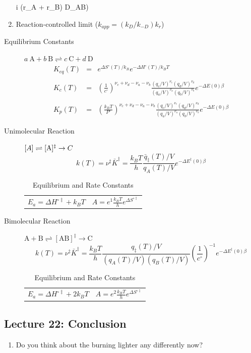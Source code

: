 \documentclass[11pt]{article}
\begin{document}
\begin{enumerate}
i (r_A + r_B) D_{AB}\))
\item Reaction-controlled limit (\(k_{app}=(k_D/k_{-D})k_r\))
\end{enumerate}

\begin{table}
\begin{center}
    \caption{\large{Equilibrium and Rate Constants}}
   \begin{description}
   \item[Equilibrium Constants] $a~\text{A} + b~\text{B} \rightleftharpoons c~\text{C} + d~\text{D} $
     \begin{eqnarray*}
       K_{eq}(T) &=& e^{\Delta S^\circ(T)/k_B}e^{-\Delta H^\circ(T)/k_BT}
       \\ \\
            K_c(T) &=&
          \left(\frac{1}{c^\circ}\right)^{\nu_c+\nu_d-\nu_a-\nu_b}\frac{(q_c/V)^{\nu_c}(q_d/V)^{\nu_d}}{(q_a/V)^{\nu_a}(q_b/V)^{\nu_b}}e^{-\Delta
            E(0)\beta}\\ \\
            K_p(T) &=&
          \left(\frac{k_BT}{P^\circ}\right)^{\nu_c+\nu_d-\nu_a-\nu_b}\frac{(q_c/V)^{\nu_c}(q_d/V)^{\nu_d}}{(q_a/V)^{\nu_a}(q_b/V)^{\nu_b}}e^{-\Delta
            E(0)\beta}
\end{eqnarray*}
\item[Unimolecular Reaction] $\text[A] \rightleftharpoons [\text{A} ]^\ddagger
  \rightarrow C$
      \begin{displaymath}
        k(T)=\nu^\ddagger \bar K^\ddagger=\frac{k_B T}{h} \frac{\bar{q}_\ddagger(T)/V}{q_A(T)/V}
          e^{-\Delta E^\ddagger(0)\beta}
      \end{displaymath}
\begin{center}
      \begin{tabular}{cc}
      $ \displaystyle E_a =\Delta H^{\circ\ddagger}+k_B T $
      & $ \displaystyle A = e^1\frac{k_B T}{h} e^{\Delta S^{\circ\ddagger}} $
      \end{tabular}
\end{center}
\item[Bimolecular Reaction] $
        \mathrm{A} + \mathrm{B} \rightleftharpoons [ \mathrm{AB}]^\ddagger
        \rightarrow \text{C}$
      \begin{displaymath}
        k(T)=\nu^\ddagger \bar K^\ddagger=\frac{k_B T}{h} \frac{q_\ddagger(T)/V}{(q_A(T)/V)(q_B(T)/V)}\left
          (\frac{1}{c^\circ}\right )^{-1}
        e^{-\Delta E^\ddagger(0)\beta}
      \end{displaymath}
      \begin{center}
        \begin{tabular}{cc}
        $ \displaystyle E_a  =\Delta H^{\circ\ddagger}+2 k_B T $ & $ \displaystyle
        A  = e^2\frac{k_B T}{h} e^{\Delta S^{\circ\ddagger}} $
      \end{tabular}
      \end{center}
   \end{description}
 \end{center}
 \end{table}
\subsection{Lecture 22: Conclusion}
\label{sec:orgce1a13f}
\begin{enumerate}
\item Do you think about the burning lighter any differently now?
\end{enumerate}
\end{document}
